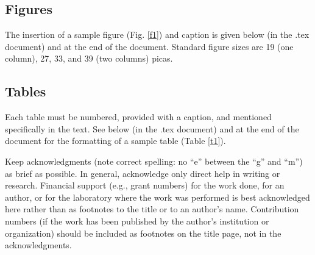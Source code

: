 \documentclass{ametsocV5}
\begin{document}
\subsection{Figures}
The insertion of a sample figure (Fig. \ref{f1})  
and caption is given below (in the .tex document) and at the end of the document. Standard figure sizes are 19 (one column), 
27, 33, and 39 (two columns) picas.

%

\subsection{Tables}
Each table must be numbered, provided with a caption, and mentioned
specifically in the text. 
See below (in the .tex document) and at the end of the document for the formatting of a sample table (Table \ref{t1}).


\acknowledgments
Keep acknowledgments (note correct spelling: no ``e'' between the ``g'' and
``m'') as brief as possible. In general, acknowledge only direct help in
writing or research. Financial support (e.g., grant numbers) for the work
done, for an author, or for the laboratory where the work was performed is
best acknowledged here rather than as footnotes to the title or to an
author's name. Contribution numbers (if the work has been published by the
author's institution or organization) should be included as footnotes on the title page,
not in the acknowledgments.
\end{document}
